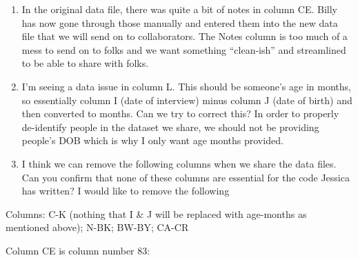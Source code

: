 \documentclass[]{article}
\newenvironment{Shaded}{\begin{snugshade}}{\end{snugshade}}
\newcommand{\CommentTok}[1]{\textcolor[rgb]{0.56,0.35,0.01}{\textit{#1}}}
\newcommand{\DataTypeTok}[1]{\textcolor[rgb]{0.13,0.29,0.53}{#1}}
\newcommand{\DecValTok}[1]{\textcolor[rgb]{0.00,0.00,0.81}{#1}}
\newcommand{\KeywordTok}[1]{\textcolor[rgb]{0.13,0.29,0.53}{\textbf{#1}}}
\newcommand{\NormalTok}[1]{#1}
\newcommand{\OperatorTok}[1]{\textcolor[rgb]{0.81,0.36,0.00}{\textbf{#1}}}
\newcommand{\StringTok}[1]{\textcolor[rgb]{0.31,0.60,0.02}{#1}}
\begin{document}
\begin{enumerate}
\def\labelenumi{\arabic{enumi})}
\item
  In the original data file, there was quite a bit of notes in column
  CE. Billy has now gone through those manually and entered them into
  the new data file that we will send on to collaborators. The Notes
  column is too much of a mess to send on to folks and we want something
  ``clean-ish'' and streamlined to be able to share with folks.
\item
  I'm seeing a data issue in column L. This should be someone's age in
  months, so essentially column I (date of interview) minus column J
  (date of birth) and then converted to months. Can we try to correct
  this? In order to properly de-identify people in the dataset we share,
  we should not be providing people's DOB which is why I only want age
  months provided.
\item
  I think we can remove the following columns when we share the data
  files. Can you confirm that none of these columns are essential for
  the code Jessica has written? I would like to remove the following
\end{enumerate}

Columns: C-K (nothing that I \& J will be replaced with age-months as
mentioned above); N-BK; BW-BY; CA-CR

Column CE is column number 83:

\begin{Shaded}
\end{Shaded}
\end{document}
